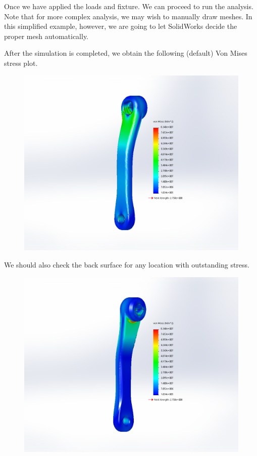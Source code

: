 \documentclass[
10pt,
a4paper,
openany,
svgnames,
]{book}
\begin{document}
\begin{solution}
Once we have applied the loads and fixture. We can proceed to run the analysis. Note that for more complex analysis, we may wish to manually draw meshes. In this simplified example, however, we are going to let SolidWorks decide the proper mesh automatically.

After the simulation is completed, we obtain the following (default) Von Mises stress plot.

\begin{figure}[H]
  \centering
  \includegraphics[scale=0.4]{pictures/Intro-CAD/Crank-result-front}
\end{figure}

We should also check the back surface for any location with outstanding stress.

\begin{figure}[H]
  \centering
  \includegraphics[scale=0.4]{pictures/Intro-CAD/Crank-result-back}
\end{figure}


\end{solution}
\end{document}
